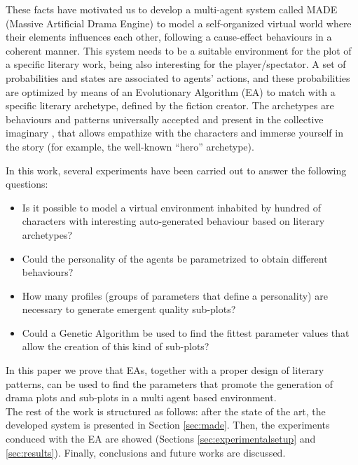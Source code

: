\documentclass[runningheads]{llncs}
\begin{document}
These facts have motivated us to develop a multi-agent system called MADE (Massive Artificial Drama Engine) to model a self-organized virtual world where their elements influences each other, following a cause-effect behaviours in a coherent manner. This system needs to be a suitable environment for the plot of a specific literary work, being also interesting for the player/spectator. A set of probabilities and states are associated to agents' actions, and these probabilities are optimized by means of an Evolutionary Algorithm (EA) to match with a specific literary archetype, defined by the fiction creator. The archetypes are behaviours and patterns universally accepted and present in the collective imaginary \cite{ArchetypesGarry05}, that allows empathize with the characters and immerse yourself in the story (for example, the well-known ``hero'' archetype).

In this work, several experiments have been carried out to answer the following questions: 

\begin{itemize}
 \item Is it possible to model a virtual environment inhabited by hundred of characters with interesting auto-generated behaviour based on literary archetypes?
 \item Could the personality of the agents be parametrized to obtain different behaviours? 
 \item How many profiles (groups of parameters that define a personality) are necessary to generate emergent quality sub-plots?
 \item Could a Genetic Algorithm be used to find the fittest parameter values that allow the creation of this kind of sub-plots?
\end{itemize}

In this paper we prove that EAs, together with a proper design of literary patterns, can be used to find the parameters that promote the generation of drama plots and sub-plots in a multi agent based environment.\\

The rest of the work is structured as follows: after the state of the art, the developed system is presented in Section \ref{sec:made}. Then, the experiments conduced with the EA are showed (Sections \ref{sec:experimentalsetup} and \ref{sec:results}). Finally, conclusions and future works are discussed.

\end{document}
